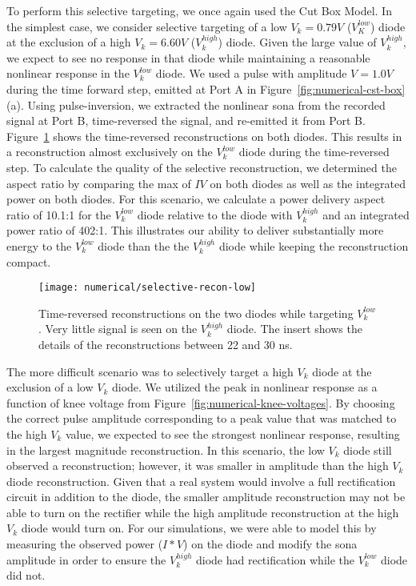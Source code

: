To perform this selective targeting, we once again used the Cut Box Model. In the simplest case, we consider selective targeting of a low $V_{k} = 0.79V$ ($V_K^{low}$) diode at the exclusion of a high $V_{k} = 6.60V$ ($V_k^{high}$) diode. Given the large value of $V_k^{high}$, we expect to see no response in that diode while maintaining a reasonable nonlinear response in the $V_k^{low}$ diode. We used a pulse with amplitude $V = 1.0 V$ during the time forward step, emitted at Port A in Figure~\ref{fig:numerical-cst-box}(a). Using pulse-inversion, we extracted the nonlinear sona from the recorded signal at Port B, time-reversed the signal, and re-emitted it from Port B. Figure~\ref{fig:numerical-selective-recon-low} shows the time-reversed reconstructions on both diodes. This results in a reconstruction almost exclusively on the $V_k^{low}$ diode during the time-reversed step. To calculate the quality of the selective reconstruction, we determined the aspect ratio by comparing the max of $IV$ on both diodes as well as the integrated power on both diodes. For this scenario, we calculate a power delivery aspect ratio of 10.1:1 for the $V_k^{low}$ diode relative to the diode with $V_k^{high}$ and an integrated power ratio of 402:1. This illustrates our ability to deliver substantially more energy to the $V_k^{low}$ diode than the the $V_k^{high}$ diode while keeping the reconstruction compact. 

\begin{figure}[t]
\centering
\texttt{[image: numerical/selective-recon-low]}
\caption[Selective reconstruction on a $V_{k}^{low}$ diode]{Time-reversed reconstructions on the two diodes while targeting $V_{k}^{low}$. Very little signal is seen on the $V_{k}^{high}$ diode. The insert shows the details of the reconstructions between 22 and 30 ns.}
\label{fig:numerical-selective-recon-low}
\end{figure}

 The more difficult scenario was to selectively target a high $V_k$ diode at the exclusion of a low $V_k$ diode. We utilized the peak in nonlinear response as a function of knee voltage from Figure~\ref{fig:numerical-knee-voltages}. By choosing the correct pulse amplitude corresponding to a peak value that was matched to the high $V_k$ value, we expected to see the strongest nonlinear response, resulting in the largest magnitude reconstruction. In this scenario, the low $V_k$ diode still observed a reconstruction; however, it was smaller in amplitude than the high $V_k$ diode reconstruction. Given that a real system would involve a full rectification circuit in addition to the diode, the smaller amplitude reconstruction may not be able to turn on the rectifier while the high amplitude reconstruction at the high $V_k$ diode would turn on. For our simulations, we were able to model this by measuring the observed power ($I*V$) on the diode and modify the sona amplitude in order to ensure the $V_k^{high}$ diode had rectification while the $V_k^{low}$ diode did not.


